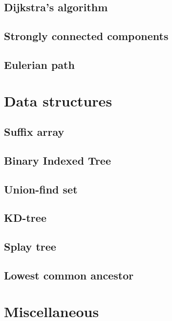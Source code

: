 \subsection{Dijkstra's algorithm}
\raggedbottom
\hrulefill
\subsection{Strongly connected components}
\raggedbottom
\hrulefill
\subsection{Eulerian path}
\raggedbottom
\hrulefill

\section{Data structures}
\subsection{Suffix array}
\raggedbottom
\hrulefill
\subsection{Binary Indexed Tree}
\raggedbottom
\hrulefill
\subsection{Union-find set}
\raggedbottom
\hrulefill
\subsection{KD-tree}
\raggedbottom
\hrulefill
\subsection{Splay tree}
\raggedbottom
\hrulefill
\subsection{Lowest common ancestor}
\raggedbottom
\hrulefill

\section{Miscellaneous}

